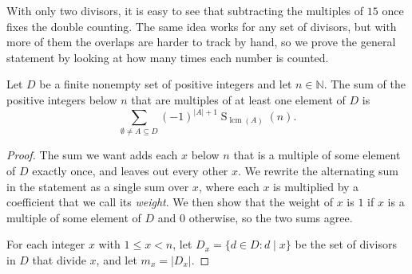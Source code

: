 \documentclass{article}
\begin{document}
With only two divisors, it is easy to see that subtracting the multiples of $15$ once fixes the double counting. The
same idea works for any set of divisors, but with more of them the overlaps are harder to track by hand, so we prove
the general statement by looking at how many times each number is counted.

\begin{lemma}\label{lem:incexc}
  Let $D$ be a finite nonempty set of positive integers and let $n \in \mathbb{N}$. The sum of the positive integers
  below $n$ that are multiples of at least one element of $D$ is
  \[
    \sum_{\emptyset \ne A \subseteq D} {(-1)}^{|A|+1} \operatorname{S}_{\operatorname{lcm}(A)}(n).
  \]
\end{lemma}
\begin{proof}
  The sum we want adds each $x$ below $n$ that is a multiple of some element of $D$ exactly once, and leaves out every
  other $x$. We rewrite the alternating sum in the statement as a single sum over $x$, where each $x$ is multiplied by a
  coefficient that we call its \emph{weight}. We then show that the weight of $x$ is $1$ if $x$ is a multiple of some
  element of $D$ and $0$ otherwise, so the two sums agree.

  For each integer $x$ with $1 \le x < n$, let $D_x = \{d \in D : d \mid x\}$ be the set of divisors in $D$ that
  divide $x$, and let $m_x = |D_x|$.


\end{proof}
\end{document}
